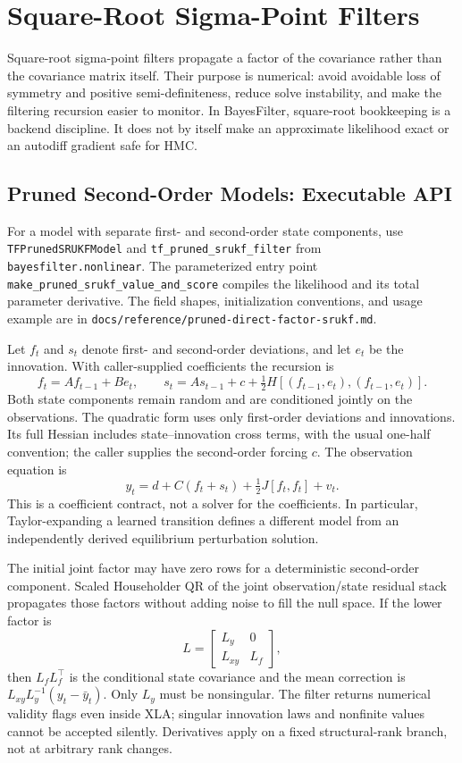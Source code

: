 \chapter{Square-Root Sigma-Point Filters}
\label{ch:bf-square-root-sigma-point}

Square-root sigma-point filters propagate a factor of the covariance rather
than the covariance matrix itself.  Their purpose is numerical: avoid avoidable
loss of symmetry and positive semi-definiteness, reduce solve instability, and
make the filtering recursion easier to monitor.  In BayesFilter, square-root
bookkeeping is a backend discipline.  It does not by itself make an
approximate likelihood exact or an autodiff gradient safe for HMC.

\section{Pruned Second-Order Models: Executable API}
\label{sec:bf-pruned-direct-factor-api}

For a model with separate first- and second-order state components, use
\texttt{TFPrunedSRUKFModel} and \texttt{tf\_pruned\_srukf\_filter} from
\texttt{bayesfilter.nonlinear}. The parameterized entry point
\texttt{make\_pruned\_srukf\_value\_and\_score} compiles the likelihood and its
total parameter derivative. The field shapes, initialization conventions,
and usage example are in
\texttt{docs/reference/pruned-direct-factor-srukf.md}.

Let $f_t$ and $s_t$ denote first- and second-order deviations, and let $e_t$
be the innovation. With caller-supplied coefficients the recursion is
\[
 f_t=A f_{t-1}+B e_t,\qquad
 s_t=A s_{t-1}+c+\tfrac12 H[(f_{t-1},e_t),(f_{t-1},e_t)].
\]
Both state components remain random and are conditioned jointly on the
observations. The quadratic form uses only first-order deviations and
innovations. Its full Hessian includes state--innovation cross terms, with
the usual one-half convention; the caller supplies the second-order forcing
$c$. The observation equation is
\[
 y_t=d+C(f_t+s_t)+\tfrac12 J[f_t,f_t]+v_t.
\]
This is a coefficient contract, not a solver for the coefficients. In
particular, Taylor-expanding a learned transition defines a different model
from an independently derived equilibrium perturbation solution.

The initial joint factor may have zero rows for a deterministic second-order
component. Scaled Householder QR of the joint observation/state residual
stack propagates those factors without adding noise to fill the null space.
If the lower factor is
\[
 L=\begin{bmatrix}L_y&0\\L_{xy}&L_f\end{bmatrix},
\]
then $L_f L_f^\top$ is the conditional state covariance and the mean correction
is $L_{xy}L_y^{-1}(y_t-\bar y_t)$. Only $L_y$ must be nonsingular. The filter
returns numerical validity flags even inside XLA; singular innovation laws
and nonfinite values cannot be accepted silently. Derivatives apply on a
fixed structural-rank branch, not at arbitrary rank changes.

